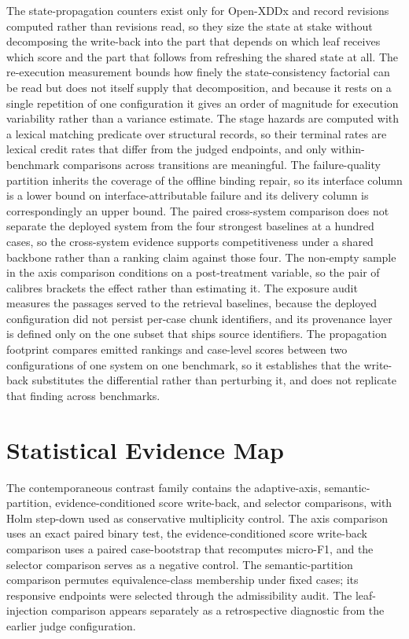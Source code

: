 \documentclass[letterpaper]{article}
\begin{document}
The state-propagation counters exist only for Open-XDDx and record revisions computed rather than revisions read, so they size the state at stake without decomposing the write-back into the part that depends on which leaf receives which score and the part that follows from refreshing the shared state at all.
The re-execution measurement bounds how finely the state-consistency factorial can be read but does not itself supply that decomposition, and because it rests on a single repetition of one configuration it gives an order of magnitude for execution variability rather than a variance estimate.
The stage hazards are computed with a lexical matching predicate over structural records, so their terminal rates are lexical credit rates that differ from the judged endpoints, and only within-benchmark comparisons across transitions are meaningful.
The failure-quality partition inherits the coverage of the offline binding repair, so its interface column is a lower bound on interface-attributable failure and its delivery column is correspondingly an upper bound.
The paired cross-system comparison does not separate the deployed system from the four strongest baselines at a hundred cases, so the cross-system evidence supports competitiveness under a shared backbone rather than a ranking claim against those four.
The non-empty sample in the axis comparison conditions on a post-treatment variable, so the pair of calibres brackets the effect rather than estimating it.
The exposure audit measures the passages served to the retrieval baselines, because the deployed configuration did not persist per-case chunk identifiers, and its provenance layer is defined only on the one subset that ships source identifiers.
The propagation footprint compares emitted rankings and case-level scores between two configurations of one system on one benchmark, so it establishes that the write-back substitutes the differential rather than perturbing it, and does not replicate that finding across benchmarks.

\section{Statistical Evidence Map}

The contemporaneous contrast family contains the adaptive-axis, semantic-partition, evidence-conditioned score write-back, and selector comparisons, with Holm step-down used as conservative multiplicity control.
The axis comparison uses an exact paired binary test, the evidence-conditioned score write-back comparison uses a paired case-bootstrap that recomputes micro-F1, and the selector comparison serves as a negative control.
The semantic-partition comparison permutes equivalence-class membership under fixed cases; its responsive endpoints were selected through the admissibility audit.
The leaf-injection comparison appears separately as a retrospective diagnostic from the earlier judge configuration.
\end{document}
